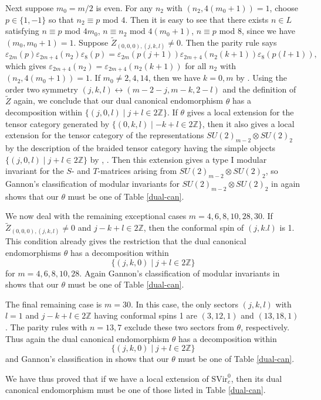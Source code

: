 \documentclass[11pt]{article}
\def\e{\varepsilon}
\def\th{\theta}
\def\SVir{{\mathrm {SVir}}}
\def\Z{{\mathbb Z}}
\begin{document}
Next suppose $m_0=m/2$ is even.
For any $n_2$ with $(n_2,4(m_0+1))=1$, choose $p\in\{1,-1\}$ so
that $n_2 \equiv p$ mod $4$.  Then it is easy to see that
there exists $n\in L$ satisfying
$n\equiv p$ mod $4m_0$,
$n\equiv n_2$ mod $4(m_0+1)$,
$n\equiv p$ mod $8$, since we have $(m_0, m_0+1)=1$.
Suppose $\tilde Z_{(0,0,0),(j,k,l)}\neq0$.  Then the parity rule says
$$\e_{2m}(p)\e_{2m+4}(n_2)\e_{8}(p)=
\e_{2m}(p(j+1))\e_{2m+4}(n_2(k+1))\e_{8}(p(l+1)),$$
which gives $\e_{2m+4}(n_2)=\e_{2m+4}(n_2(k+1))$
for all $n_2$ with $(n_2,4(m_0+1))=1$.  If $m_0\neq 2,4,14$, then
we have $k=0,m$ by \cite{G}.  Using the order two symmetry
$(j,k,l)\leftrightarrow(m-2-j,m-k,2-l)$ and the
definition of $\tilde Z$ again,
we conclude that our dual canonical endomorphism $\th$ has a 
decomposition within $\{(j,0,l)\mid j+l\in2\Z\}$.
If $\th$ gives a local extension for the
tensor category generated by $\{(0,k,l)\mid -k+l\in2\Z\}$, then
it also gives a local extension for the tensor category
of the representations $SU(2)_{m-2}\otimes SU(2)_2$ by
the description of the braided tensor category having
the simple objects $\{(j,0,l)\mid j+l\in2\Z\}$ by
\cite[Section 4.3]{X1},
\cite[Proposition 2.3.1]{X6}.  Then this extension
gives a type I modular invariant
for the $S$- and $T$-matrices arising from $SU(2)_{m-2}\otimes SU(2)_2$,
so Gannon's classification of modular invariants for
$SU(2)_{m-2}\otimes SU(2)_2$ in \cite[Section 7]{G} again shows that
our $\th$ must be one of Table \ref{dual-can}.

We now deal with the remaining exceptional cases $m=4,6,8,10,28,30$.
If $\tilde Z_{(0,0,0),(j,k,l)}\neq0$ and $j-k+l\in2\Z$, then the
conformal spin of $(j,k.l)$ is 1.  This condition already
gives the restriction that the dual canonical endomorphisms
$\th$ has a decomposition within
$$\{(j,k,0)\mid j+l\in2\Z\}$$
for $m=4,6,8,10,28$.  Again Gannon's classification of modular invariants
in \cite{G} shows that our $\th$ must be one of Table \ref{dual-can}.

The final remaining case is $m=30$.  In this case, 
the only sectors $(j,k,l)$ with $l=1$ and $j-k+l\in2\Z$
having conformal spins 1 are
$(3,12,1)$ and $(13,18,1)$.
The parity rules with $n=13, 7$
exclude these two sectors from $\th$, respectively.  Thus again
the dual canonical endomorphism $\th$ has a decomposition within
$$\{(j,k,0)\mid j+l\in2\Z\}$$
and Gannon's classification in \cite{G} shows that our $\th$ must
be one of Table \ref{dual-can}.

We have thus proved that if we have a local extension of
$\SVir^0_c$, then its dual canonical endomorphism must be one of
those listed in Table \ref{dual-can}.
\end{document}
